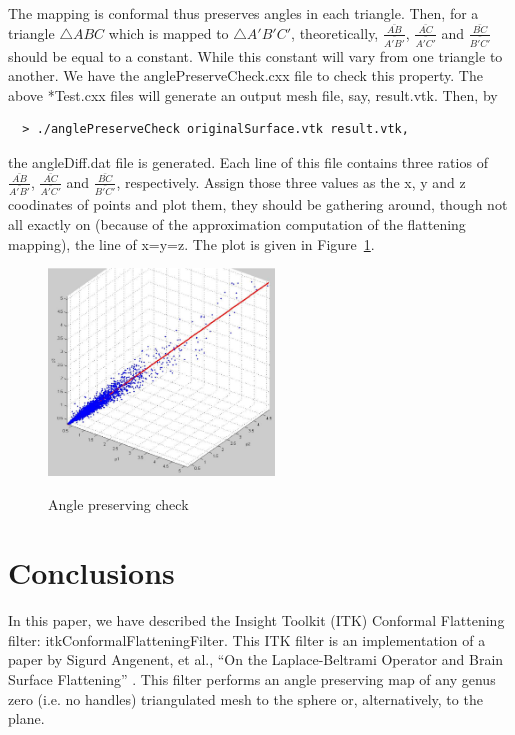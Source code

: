 \documentclass{InsightArticle}
\begin{document}
  The mapping is conformal thus preserves angles in each
  triangle. Then, for a triangle $\triangle ABC$ which is mapped to
  $\triangle A'B'C'$, theoretically, $\frac{\bar{AB}}{\bar{A'B'}}$,
  $\frac{\bar{AC}}{\bar{A'C'}}$ and $\frac{\bar{BC}}{\bar{B'C'}}$
  should be equal to a constant. While this constant will vary from
  one triangle to another. We have the anglePreserveCheck.cxx file to
  check this property.  The above *Test.cxx files will generate an
  output mesh file, say, result.vtk. Then, by
  \begin{verbatim}
  > ./anglePreserveCheck originalSurface.vtk result.vtk,
  \end{verbatim}
  the angleDiff.dat file is generated. Each line of this file contains
  three ratios of $\frac{\bar{AB}}{\bar{A'B'}}$,
  $\frac{\bar{AC}}{\bar{A'C'}}$ and $\frac{\bar{BC}}{\bar{B'C'}}$,
  respectively. Assign those three values as the x, y and z coodinates
  of points and plot them, they should be gathering around, though not
  all exactly on (because of the approximation computation of the
  flattening mapping), the line of x=y=z. The plot is given in
  Figure~\ref{anglePreservingCheck}.
  \begin{figure}[h]
		\begin{center}
			\includegraphics[width=6cm]{anglePreservingCheck.eps} \label{anglePreservingCheck}
    \end{center}
    \vspace{-.25in} \caption{Angle preserving check}
  \end{figure}
  
	\section{Conclusions}
	In this paper, we have described the Insight Toolkit (ITK) Conformal
	Flattening filter: itkConformalFlatteningFilter. This ITK filter is
	an implementation of a paper by Sigurd Angenent, et al., ``On the
	Laplace-Beltrami Operator and Brain Surface Flattening''
	\cite{angenent1999lbo}. This filter performs an angle preserving map
	of any genus zero (i.e. no handles) triangulated mesh to the sphere
	or, alternatively, to the plane.
\end{document}
